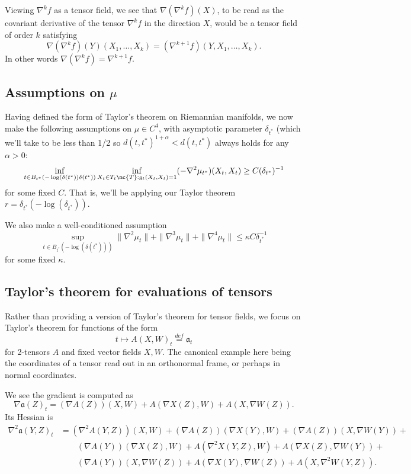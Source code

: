 \documentclass{article}
\begin{document}
Viewing $\nabla^{k} f$ as a tensor field, we see that $\nabla ( \nabla^k f)(X)$, to be read as the covariant derivative of the tensor $\nabla^k f$ in the direction
$X$, would be a tensor field of order $k$ satisfying
$$
\nabla(\nabla^k f)(Y)(X_1, \dots, X_k) = (\nabla^{k+1} f)(Y, X_1, \dots, X_k).
$$
In other words $\nabla (\nabla^k f) = \nabla^{k+1} f$.

\subsection{Assumptions on $\mu$}

Having defined the form of Taylor's theorem on Riemannian manifolds, 
we now make the following assumptions on $\mu \in C^4$, with asymptotic parameter $\delta_{t^*}$ (which we'll take to be less than 1/2 so $d(t,t^*)^{1+\alpha}<d(t,t^*)$ always holds for any $\alpha>0$:
$$
\inf_{t \in B_{t^*}(-\log(\delta(t^*)) \delta(t^*))} \inf_{X_t \in T_t\mc{T}: g_t(X_t,X_t)=1} (-\nabla^2 \mu_{t^*})(X_t, X_t) \geq C (\delta_{t^*})^{-1}
$$
for some fixed $C$. That is, we'll be applying our Taylor theorem $r=\delta_{t^*}(-\log(\delta_{t^*}))$.

  We also make a well-conditioned assumption 
  $$
\sup_{t \in B_{t^*}(-\log(\delta(t^*)))} \|\nabla^2 \mu_t\| + \|\nabla^3 \mu_t\| + \|\nabla^4 \mu_t\| \leq \kappa C \delta_{t^*}^{-1}
  $$
for some fixed $\kappa$. 


\subsection{Taylor's theorem for evaluations of tensors}

Rather than providing a version of Taylor's theorem for tensor fields, we focus on Taylor's theorem for functions of
the form
$$
t \mapsto A(X,W)_t \overset{def}{=} \mathfrak{a}_t
$$
for 2-tensors $A$ and fixed vector fields $X, W$. The canonical example here being the coordinates
of a tensor read out in an orthonormal frame, or perhaps in normal coordinates.

We see the gradient is computed as
$$
\nabla \mathfrak{a}(Z)_t = (\nabla A(Z))(X, W) + A(\nabla X(Z), W) + A(X, \nabla W(Z)).
$$
Its Hessian is
$$
\begin{aligned}
  \nabla^2 \mathfrak{a}(Y, Z)_t &= (\nabla^2 A(Y,Z))(X, W) + (\nabla A(Z))(\nabla X(Y), W) + (\nabla A(Z))(X, \nabla W(Y)) + \\
& \qquad  (\nabla A(Y))(\nabla X(Z), W) + A(\nabla^2 X(Y, Z), W) + A(\nabla X(Z), \nabla W(Y)) + \\
& \qquad  (\nabla A(Y))(X, \nabla W(Z)) + A(\nabla X(Y), \nabla W(Z)) + A(X, \nabla^2 W(Y, Z)).  \\
\end{aligned}
$$
\end{document}
